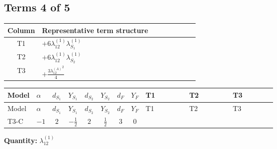 \documentclass[8pt]{article}
\begin{document}
\begin{landscape}
\subsection*{Terms 4 of 5}
\begin{center}
\begin{tabular}{@{}c >{\raggedright\arraybackslash}p{0.82\linewidth}@{}}
\toprule
Column & Representative term structure \\
\midrule
T1 & \(\displaystyle +6 {\lambda_{12}^{(1)}} {\lambda_{S_1}^{(1)}}\) \\
\midrule
T2 & \(\displaystyle +6 {\lambda_{12}^{(1)}} {\lambda_{S_2}^{(1)}}\) \\
\midrule
T3 & \(\displaystyle +\frac{3 {\lambda_{12}^{(A)}}^2}{4}\) \\
\midrule
\bottomrule
\end{tabular}
\end{center}
\smallskip
\tiny
\begin{longtable}{@{}llcccccc >{\raggedright\arraybackslash}p{0.21\linewidth} >{\raggedright\arraybackslash}p{0.21\linewidth} >{\raggedright\arraybackslash}p{0.21\linewidth}@{}}
\toprule
Model & $\alpha$ & $d_{S_1}$ & $Y_{S_1}$ & $d_{S_2}$ & $Y_{S_2}$ & $d_F$ & $Y_F$ & T1 & T2 & T3 \\
\midrule
\endfirsthead
\toprule
Model & $\alpha$ & $d_{S_1}$ & $Y_{S_1}$ & $d_{S_2}$ & $Y_{S_2}$ & $d_F$ & $Y_F$ & T1 & T2 & T3 \\
\midrule
\endhead
T3-C & $-1$ & $2$ & $-\frac{1}{2}$ & $2$ & $\frac{1}{2}$ & $3$ & $0$ & \scriptsize\adjustbox{max width=\linewidth}{$\begin{gathered} +6 {\lambda_{12}^{(1)}} {\lambda_{S_1}^{(1)}}\end{gathered}$} & \scriptsize\adjustbox{max width=\linewidth}{$\begin{gathered} +6 {\lambda_{12}^{(1)}} {\lambda_{S_2}^{(1)}}\end{gathered}$} & \scriptsize\adjustbox{max width=\linewidth}{$\begin{gathered} +\frac{3 {\lambda_{12}^{(A)}}^2}{4}\end{gathered}$} \\
\midrule
\bottomrule
\end{longtable}
\clearpage
\noindent\textbf{Quantity: }$\lambda_{12}^{(1)}$\par\smallskip

\end{landscape}
\end{document}
